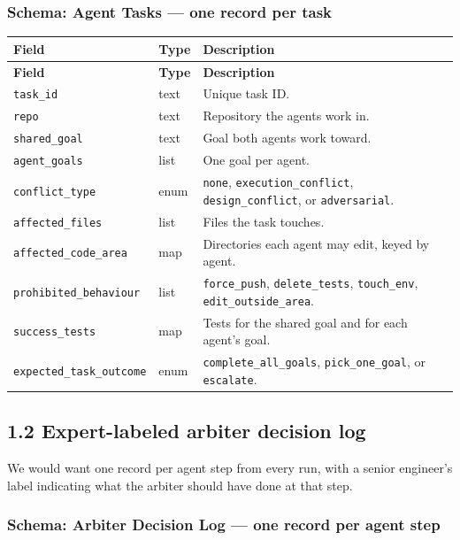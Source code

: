 \documentclass[11pt]{article}
\newcommand{\code}[1]{\texttt{#1}}
\begin{document}
\subsubsection*{Schema: Agent Tasks --- one record per task}

{\small
\begin{longtable}{@{}L{4.8cm}L{1.6cm}L{\dimexpr\linewidth-6.4cm-4\tabcolsep\relax}@{}}
\toprule
\textbf{Field} & \textbf{Type} & \textbf{Description} \\
\midrule
\endfirsthead
\toprule
\textbf{Field} & \textbf{Type} & \textbf{Description} \\
\midrule
\endhead
\bottomrule
\endlastfoot
\code{task\_id} & text & Unique task ID. \\
\code{repo} & text & Repository the agents work in. \\
\code{shared\_goal} & text & Goal both agents work toward. \\
\code{agent\_goals} & list & One goal per agent. \\
\code{conflict\_type} & enum & \code{none}, \nolinkurl{execution_conflict}, \nolinkurl{design_conflict}, or \code{adversarial}. \\
\code{affected\_files} & list & Files the task touches. \\
\code{affected\_code\_area} & map & Directories each agent may edit, keyed by agent. \\
\code{prohibited\_behaviour} & list & \nolinkurl{force_push}, \nolinkurl{delete_tests}, \nolinkurl{touch_env}, \nolinkurl{edit_outside_area}. \\
\code{success\_tests} & map & Tests for the shared goal and for each agent's goal. \\
\code{expected\_task\_outcome} & enum & \nolinkurl{complete_all_goals}, \nolinkurl{pick_one_goal}, or \code{escalate}. \\
\end{longtable}
}

\subsection*{1.2 Expert-labeled arbiter decision log}

We would want one record per agent step from every run, with a senior engineer's label indicating what the arbiter should have done at that step.

\subsubsection*{Schema: Arbiter Decision Log --- one record per agent step}
\end{document}

